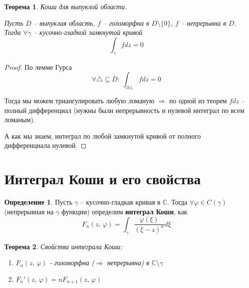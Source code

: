 \documentclass[a4paper,12pt]{article}
\renewcommand{\phi}{\ensuremath{\varphi}}
\theoremstyle{plain}
\newtheorem{theorem}{Теорема}[section]
\theoremstyle{definition}
\newtheorem{definition}{Определение}[section]
\theoremstyle{remark}
\begin{document}
\begin{theorem}
	Коши для выпуклой области.

	Пусть $D$ -- выпуклая область, $f$ -- голоморфна в $D \setminus \{0\}$, $f$ -- непрерывна в $D$. Тогда $\forall \gamma$ -- кусочно-гладкой замкнутой кривой
	\[
		\int_\gamma fdz = 0
	\]
\end{theorem}

\begin{proof}
	По лемме Гурса
	\[
		\forall \triangle \subseteq D :\: \int_{\partial \triangle} fdz = 0
	\]

	Тогда мы можем триангулировать любую ломаную $\Rightarrow$ по одной из теорем $fdz$ -- полный дифференциал (нужны были непрерывность и нулевой интеграл по всем ломаным).

	А как мы знаем, интеграл по любой замкнутой кривой от полного дифференциала нулевой.
\end{proof}

\section{Интеграл Коши и его свойства}
\begin{definition}
	Пусть $\gamma$ -- кусочно-гладкая кривая в $\mathbb{C}$. Тогда $\forall \phi \in C(\gamma)$ (непрерывная на $\gamma$ функции) определим \textbf{интеграл Коши}, как
	\[
		F_n(z,\, \phi) = \int_\gamma \frac{\phi(\xi)}{(\xi - z)^n}d\xi
	\]
\end{definition}

\begin{theorem}
	Свойства интеграла Коши:
	\begin{enumerate}
		\item $F_n(z,\, \phi)$ - голоморфна ($\Rightarrow$ непрерывна) в $\mathbb{C} \setminus \gamma$
		\item $F_n'(z,\, \phi) = nF_{n + 1}(z,\, \phi)$
	\end{enumerate}
\end{theorem}
\end{document}
